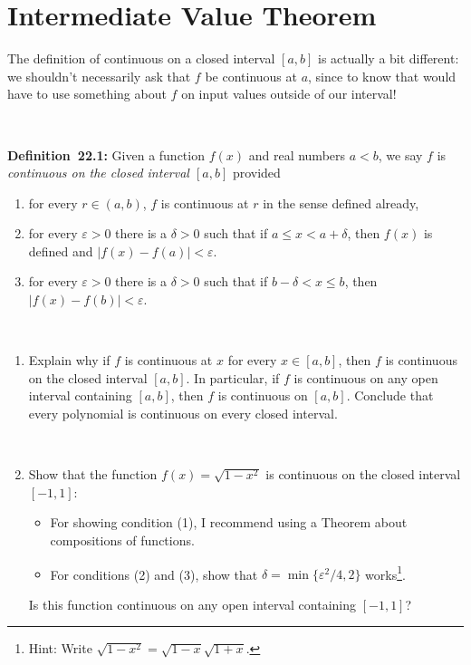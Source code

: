 \documentclass[12pt]{amsart}
\newcommand{\e}{\varepsilon}
\def\d{\delta}
\begin{document}
	
	\thispagestyle{empty}
	
	\section*{Intermediate Value Theorem}
	
\begin{framed} 
 \noindent The definition of continuous on a closed interval $[a,b]$ is actually a bit different: we shouldn't necessarily ask that $f$ be continuous at $a$, since to know that would have to use something about $f$ on input values outside of our interval!
 
 \
 
\noindent\textbf{Definition~22.1:}  Given a function $f(x)$ and real numbers $a < b$,
we say $f$ is {\em continuous on the closed interval $[a,b]$} provided 
\begin{enumerate}
\item for every $r \in (a,b)$, $f$ is  continuous at $r$ in the sense defined already,
\item for every $\e > 0$ there is a $\d > 0$ such that if $a \leq x < a+\d$, then $f(x)$ is defined and ${|f(x)
  - f(a)| < \e}$.
\item for every $\e > 0$ there is a $\d > 0$ such that if $b -\d < x \leq b$, then ${|f(x)
  - f(b)| < \e}$.
\end{enumerate}
\end{framed}

\

\begin{enumerate}
 \item Explain why if $f$ is continuous at $x$ for every $x\in[a,b]$, then $f$ is continuous on the closed interval $[a,b]$. In particular, if $f$ is continuous on any open interval containing $[a,b]$, then $f$ is continuous on $[a,b]$. Conclude that every polynomial is continuous on every closed interval.


\

\item Show that the function $f(x) = \sqrt{1-x^2}$ is continuous on the closed interval $[-1,1]$:
\begin{itemize}
\item For showing condition (1), I recommend using a Theorem about compositions of functions.
\item For conditions (2) and (3), show that $\delta = \min\{\e^2 /4 , 2\}$ works\footnote{Hint: Write $\sqrt{1-x^2} = \sqrt{1-x} \sqrt{1+x}$.}.
\end{itemize}
Is this function continuous on any open interval containing $[-1,1]$?
\end{enumerate}
\end{document}
